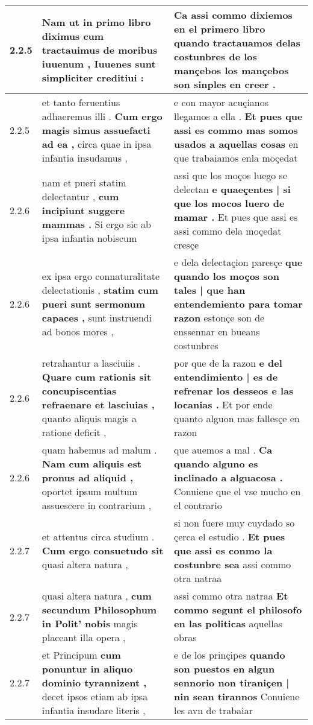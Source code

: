 \begin{tabular}{|p{1cm}|p{6.5cm}|p{6.5cm}|}
2.2.5 & Nam ut in primo libro diximus \textbf{ cum tractauimus de moribus iuuenum , } Iuuenes sunt simpliciter creditiui : & Ca assi commo dixiemos en el primero libro \textbf{ quando tractauamos delas costunbres de los mançebos } los mançebos son sinples en creer . \\\hline
2.2.5 & et tanto feruentius adhaeremus illi . \textbf{ Cum ergo magis simus assuefacti ad ea , } circa quae in ipsa infantia insudamus , & e con mayor acuçianos llegamos a ella . \textbf{ Et pues que assi es commo mas somos usados a aquellas cosas } en que trabaiamos enla moçedat \\\hline
2.2.6 & nam et pueri statim delectantur , \textbf{ cum incipiunt suggere mammas . } Si ergo sic ab ipsa infantia nobiscum & assi que los moços luego se delectan \textbf{ e quaeçentes | si que los mocos luero de mamar . } Et pues que assi es assi commo dela moçedat cresçe \\\hline
2.2.6 & ex ipsa ergo connaturalitate delectationis , \textbf{ statim cum pueri sunt sermonum capaces , } sunt instruendi ad bonos mores , & e dela delectaçion paresçe \textbf{ que quando los moços son tales | que han entendemiento para tomar razon } estonçe son de enssennar en bueans costunbres \\\hline
2.2.6 & retrahantur a lasciuiis . \textbf{ Quare cum rationis sit concupiscentias refraenare et lasciuias , } quanto aliquis magis a ratione deficit , & por que de la razon \textbf{ e del entendimiento | es de refrenar los desseos e las locanias . } Et por ende quanto alguon mas fallesçe en razon \\\hline
2.2.6 & quam habemus ad malum . \textbf{ Nam cum aliquis est pronus ad aliquid , } oportet ipsum multum assuescere in contrarium , & que auemos a mal . \textbf{ Ca quando alguno es inclinado a alguacosa . } Conuiene que el vse mucho en el contrario \\\hline
2.2.7 & et attentus circa studium . \textbf{ Cum ergo consuetudo sit } quasi altera natura , & si non fuere muy cuydado so çerca el estudio . \textbf{ Et pues que assi es conmo la costunbre sea } assi commo otra natraa \\\hline
2.2.7 & quasi altera natura , \textbf{ cum secundum Philosophum in Polit’ nobis } magis placeant illa opera , & assi commo otra natraa \textbf{ Et commo segunt el philosofo en las politicas } aquellas obras \\\hline
2.2.7 & et Principum \textbf{ cum ponuntur in aliquo dominio tyrannizent , } decet ipsos etiam ab ipsa infantia insudare literis , & e de los prinçipes \textbf{ quando son puestos en algun sennorio non tiraniçen | nin sean tirannos } Conuiene les avn de trabaiar \\\hline

\end{tabular}
